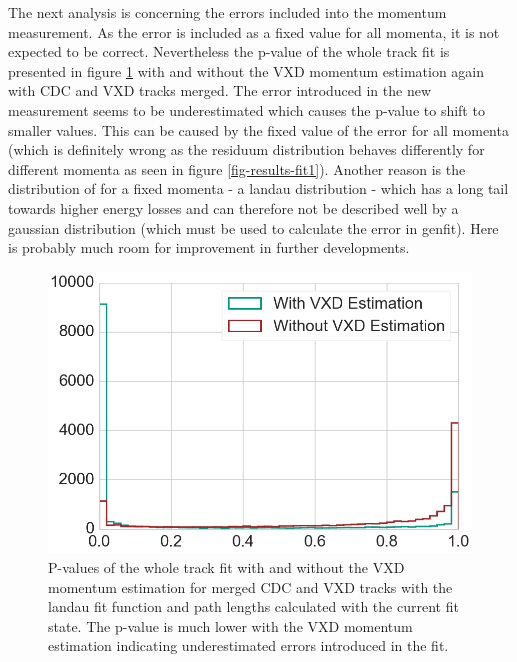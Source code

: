 


The next analysis is concerning the errors included into the momentum measurement. As the error is included as a fixed value for all momenta, it is not expected to be correct. Nevertheless the p-value of the whole track fit is presented in figure \ref{fig-p-values} with and without the VXD momentum estimation again with CDC and VXD tracks merged. The error introduced in the new measurement seems to be underestimated which causes the p-value to shift to smaller values. This can be caused by the fixed value of the error for all momenta (which is definitely wrong as the residuum distribution behaves differently for different momenta as seen in figure \ref{fig-results-fit1}). Another reason is the distribution of \dedx for a fixed momenta - a landau distribution - which has a long tail towards higher energy losses and can therefore not be described well by a gaussian distribution (which must be used to calculate the error in genfit). Here is probably much room for improvement in further developments.

\begin{figure}
  \centering
  \includegraphics[width=0.7\linewidth]{figures/vxd/pValue.png}
  \caption{P-values of the whole track fit with and without the VXD momentum estimation for merged CDC and VXD tracks with the landau fit function and path lengths calculated with the current fit state. The p-value is much lower with the VXD momentum estimation indicating underestimated errors introduced in the fit.}
  \label{fig-p-values}
\end{figure}


